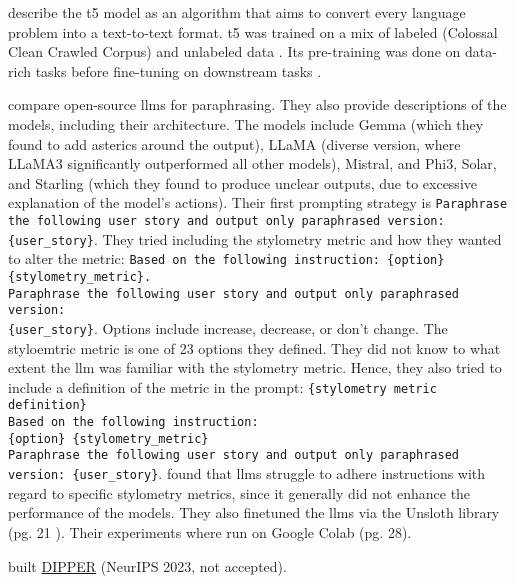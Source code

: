 \citet{palivela_optimization_2021,kurt_pehlivanoglu_comparative_2024} describe the 
\ac{t5} model as an algorithm that aims to convert every language problem into a text-to-text format.
\ac{t5} was trained on a mix of labeled (Colossal Clean Crawled Corpus) and unlabeled data \cite{palivela_optimization_2021}.
Its pre-training was done on data-rich tasks before fine-tuning on downstream tasks \cite{kurt_pehlivanoglu_comparative_2024}.

\citet{master_thesis_paraphrasing_2024} compare open-source \acp{llm} for paraphrasing.
They also provide descriptions of the models, including their architecture.
The models include Gemma (which they found to add asterics around the output), LLaMA (diverse version, where LLaMA3 significantly outperformed all other models), 
Mistral, and Phi3, Solar, and Starling (which they found to produce unclear outputs, due to excessive explanation of the model's actions).
Their first prompting strategy is \texttt{Paraphrase the following user story and output only paraphrased version:\\
\{user\_story\}}.
They tried including the stylometry metric and how they wanted to alter the metric: 
\texttt{Based on the following instruction: \{option\} \{stylometry\_metric\}.\\
Paraphrase the following user story and output only paraphrased version:\\
\{user\_story\}}.
Options include increase, decrease, or don't change.
The styloemtric metric is one of 23 options they defined.
They did not know to what extent the \ac{llm} was familiar with the stylometry metric. 
Hence, they also tried to include a definition of the metric in the prompt:
\texttt{\{stylometry metric definition\}\\Based on the following instruction:\\
\{option\} \{stylometry\_metric\} \\
Paraphrase the following user story and output only paraphrased version: \{user\_story\}}.
\citet{master_thesis_paraphrasing_2024} found that \acp{llm} struggle to adhere instructions with regard to specific stylometry metrics, 
since it generally did not enhance the performance of the models.
They also finetuned the \acp{llm} via the Unsloth library (pg. 21 \cite{master_thesis_paraphrasing_2024}).
Their experiments where run on Google Colab (pg. 28).

\citet{krishna_paraphrasing_2023} built \href{https://huggingface.co/kalpeshk2011/dipper-paraphraser-xxl}{DIPPER} (NeurIPS 2023, not accepted).
 

